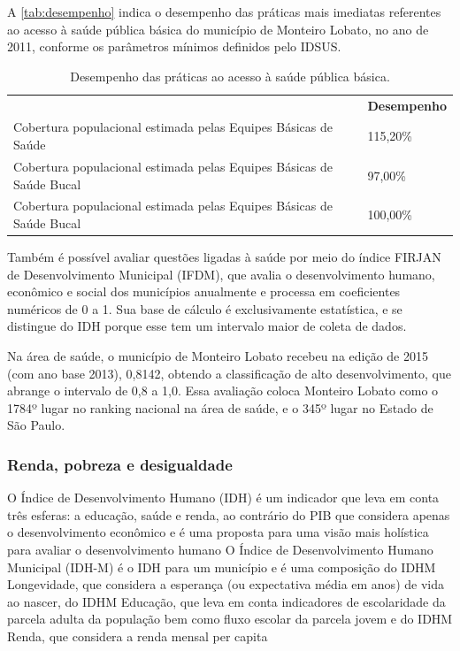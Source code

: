 A \autoref{tab:desempenho} indica o desempenho das práticas mais imediatas referentes ao acesso à saúde pública básica do município de Monteiro Lobato, no ano de 2011, conforme os parâmetros mínimos definidos pelo IDSUS.

\begin{table}[htbp]
	\centering
	\caption{Desempenho das práticas ao acesso à saúde pública básica.}
	\begin{tabular}{P{0.5\textwidth}|P{0.15\textwidth}}
		 & \textcolor[rgb]{ 1,  1,  1}{\textbf{Desempenho}} \\
		 Cobertura populacional estimada pelas Equipes Básicas de Saúde & 115,20\% \\
		 Cobertura populacional estimada pelas Equipes Básicas de Saúde Bucal & 97,00\% \\
		 Cobertura populacional estimada pelas Equipes Básicas de Saúde Bucal & 100,00\% \\
	\end{tabular}%
	\label{tab:desempenho}%
\end{table}%

Também é possível avaliar questões ligadas à saúde por meio do índice FIRJAN de Desenvolvimento Municipal (IFDM), que avalia o desenvolvimento humano, econômico e social dos municípios anualmente e processa em coeficientes numéricos de 0 a 1. Sua base de cálculo é exclusivamente estatística, e se distingue do IDH porque esse tem um intervalo maior de coleta de dados. 		

Na área de saúde, o município de Monteiro Lobato recebeu na edição de 2015 (com ano base 2013), 0,8142, obtendo a classificação de alto desenvolvimento, que abrange o intervalo de 0,8 a 1,0. Essa avaliação coloca Monteiro Lobato como o 1784º lugar no ranking nacional na área de saúde, e o 345º lugar no Estado de São Paulo.

\subsubsection{Renda, pobreza e desigualdade}

O Índice de Desenvolvimento Humano (IDH) é um indicador que leva em conta três esferas: a educação, saúde e renda, ao contrário do PIB que considera apenas o desenvolvimento econômico e é uma proposta para uma visão mais holística para avaliar o desenvolvimento humano \cite{PNUD2017} O Índice de Desenvolvimento Humano Municipal (IDH-M) é o IDH para um município e é uma composição do IDHM Longevidade, que considera a esperança (ou expectativa média em anos) de vida ao nascer, do IDHM Educação, que leva em conta indicadores de escolaridade da parcela adulta da população bem como fluxo escolar da parcela jovem e do IDHM Renda, que considera a renda mensal per capita 

